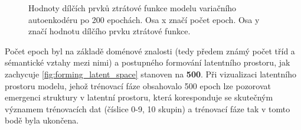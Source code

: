 \begin{figure}[H]
    \centering
    \qquad
    \caption{Hodnoty dílčích prvků ztrátové funkce modelu variačního autoenkodéru po 200 epochách. Osa x značí počet epoch. Osa y značí hodnotu dílčího prvku ztrátové funkce.}
    \label{fig:example}%
\end{figure}

Počet epoch byl na základě doménové znalosti (tedy předem známý počet tříd a sémantické vztahy mezi nimi) a postupného formování latentního prostoru, jak zachycuje \autoref{fig:forming_latent_space} stanoven na \textbf{500}.
Při vizualizaci latentního prostoru modelu, jehož trénovací fáze obsahovalo 500 epoch lze pozorovat emergenci struktury v latentní prostoru, která koresponduje se skutečným významem trénovacích dat (číslice 0-9, 10 skupin) a trénovací fáze tak v tomto bodě byla ukončena.